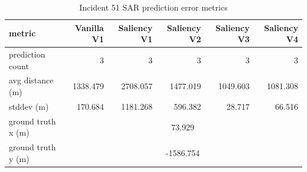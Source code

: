 \begin{table}[ht]
\centering
\caption{Incident 51 SAR prediction error metrics}
\label{tab:sar-incident-51}
\begin{tabular}{lrrrrr}
\hline
metric & Vanilla V1 & Saliency V1 & Saliency V2 & Saliency V3 & Saliency V4 \\
\hline
prediction count & 3 & 3 & 3 & 3 & 3 \\
avg distance (m) & 1338.479 & 2708.057 & 1477.019 & 1049.603 & 1081.308 \\
stddev (m) & 170.684 & 1181.268 & 596.382 & 28.717 & 66.516 \\
ground truth x (m) & \multicolumn{5}{c}{73.929} \\
ground truth y (m) & \multicolumn{5}{c}{-1586.754} \\
\hline
\end{tabular}
\end{table}
